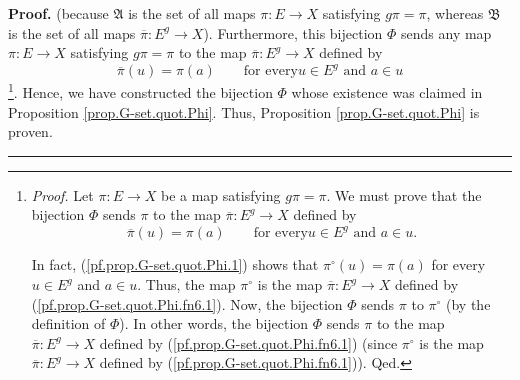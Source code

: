 \documentclass[numbers=enddot,12pt,final,onecolumn,notitlepage,abstracton]{scrartcl}
\theoremstyle{definition}
\newenvironment{proof}[1][Proof]{\noindent\textbf{#1.} }{\ \rule{0.5em}{0.5em}}
\newenvironment{verlong}{}{}
\begin{document}
\begin{verlong}
\begin{proof}
(because $\mathfrak{A}$ is the set of all maps $\pi:E\rightarrow X$ satisfying
$g\pi=\pi$, whereas $\mathfrak{B}$ is the set of all maps $\overline{\pi
}:E^{g}\rightarrow X$). Furthermore, this bijection $\Phi$ sends any map
$\pi:E\rightarrow X$ satisfying $g\pi=\pi$ to the map $\overline{\pi}%
:E^{g}\rightarrow X$ defined by
\[
\overline{\pi}\left(  u\right)  =\pi\left(  a\right)  \qquad\text{for every
}u\in E^{g}\text{ and }a\in u
\]
\footnote{\textit{Proof.} Let $\pi:E\rightarrow X$ be a map satisfying
$g\pi=\pi$. We must prove that the bijection $\Phi$ sends $\pi$ to the map
$\overline{\pi}:E^{g}\rightarrow X$ defined by
\begin{equation}
\overline{\pi}\left(  u\right)  =\pi\left(  a\right)  \qquad\text{for every
}u\in E^{g}\text{ and }a\in u.\label{pf.prop.G-set.quot.Phi.fn6.1}%
\end{equation}
\par
In fact, (\ref{pf.prop.G-set.quot.Phi.1}) shows that $\pi^{\circ}\left(
u\right)  =\pi\left(  a\right)  $ for every $u\in E^{g}$ and $a\in u$. Thus,
the map $\pi^{\circ}$ is the map $\overline{\pi}:E^{g}\rightarrow X$ defined
by (\ref{pf.prop.G-set.quot.Phi.fn6.1}). Now, the bijection $\Phi$ sends $\pi$
to $\pi^{\circ}$ (by the definition of $\Phi$). In other words, the bijection
$\Phi$ sends $\pi$ to the map $\overline{\pi}:E^{g}\rightarrow X$ defined by
(\ref{pf.prop.G-set.quot.Phi.fn6.1}) (since $\pi^{\circ}$ is the map
$\overline{\pi}:E^{g}\rightarrow X$ defined by
(\ref{pf.prop.G-set.quot.Phi.fn6.1})). Qed.}. Hence, we have constructed the
bijection $\Phi$ whose existence was claimed in Proposition
\ref{prop.G-set.quot.Phi}. Thus, Proposition \ref{prop.G-set.quot.Phi} is proven.
\end{proof}
\end{verlong}
\end{document}
